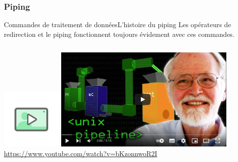 \documentclass{beamer}
\begin{document}
    \subsubsection{Piping}\label{subsubsec:piping}
    \begin{frame}{Commandes de traitement de données}{L'histoire du piping}
        Les opérateurs de redirection et le piping fonctionnent toujours évidement avec ces commandes.
        \bigbreak
        \begin{columns}
            \centering
            \includegraphics[width=3cm]{image/digicomp-video}
            \includegraphics[width=9cm]{image/kernighan-piping-video} \\ \url{https://www.youtube.com/watch?v=bKzonnwoR2I} \\
        \end{columns}
    \end{frame}
\end{document}
